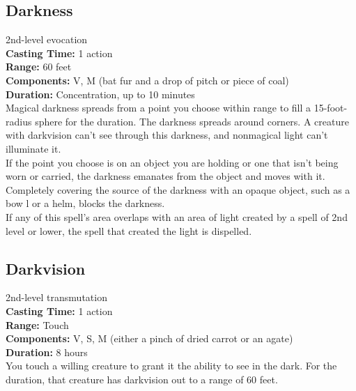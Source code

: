 \documentclass[11pt, A4paper, english]{article}
\begin{document}
		\subsection{Darkness}
2nd-level evocation \\
\textbf{Casting Time:} 1 action \\
\textbf{Range:} 60 feet \\
\textbf{Components:} V, M (bat fur and a drop of pitch or piece of coal) \\
\textbf{Duration:} Concentration, up to 10 minutes \\
Magical darkness spreads from a point you choose within range to fill a 15-foot-radius sphere for the duration. The darkness spreads around corners. A creature with darkvision can’t see through this darkness, and nonmagical light can’t illuminate it. \\
If the point you choose is on an object you are holding or one that isn’t being worn or carried, the darkness emanates from the object and moves with it. Completely covering the source of the darkness with an opaque object, such as a bow l or a helm, blocks the darkness. \\
If any of this spell’s area overlaps with an area of light created by a spell of 2nd level or lower, the spell that created the light is dispelled.

		\subsection{Darkvision}
2nd-level transmutation \\
\textbf{Casting Time:} 1 action \\
\textbf{Range:} Touch \\
\textbf{Components:} V, S, M (either a pinch of dried carrot or an agate) \\
\textbf{Duration:} 8 hours \\
You touch a willing creature to grant it the ability to see in the dark. For the duration, that creature has darkvision out to a range of 60 feet.
\end{document}
